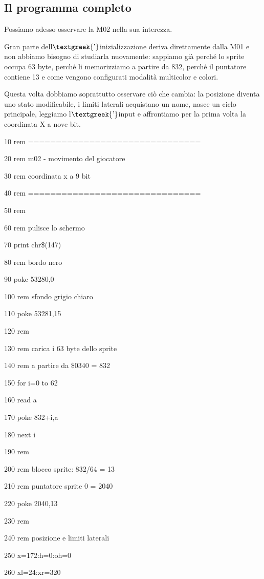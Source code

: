 \documentclass{article}
\begin{document}
\subsection{Il programma completo}
Possiamo adesso osservare la M02 nella sua interezza.

Gran parte dell$\text{\textgreek{’}}$inizializzazione deriva direttamente dalla M01 e non abbiamo bisogno di studiarla
nuovamente: sappiamo già perché lo sprite occupa 63 byte, perché li memorizziamo a partire da 832, perché il puntatore
contiene 13 e come vengono configurati modalità multicolor e colori.

Questa volta dobbiamo soprattutto osservare ciò che cambia: la posizione diventa uno stato modificabile, i limiti
laterali acquistano un nome, nasce un ciclo principale, leggiamo l$\text{\textgreek{’}}$input e affrontiamo per la
prima volta la coordinata X a nove bit.

10 rem ===============================

20 rem m02 - movimento del giocatore

30 rem coordinata x a 9 bit

40 rem ===============================

50 rem

60 rem pulisce lo schermo

70 print chr\$(147)

80 rem bordo nero

90 poke 53280,0

100 rem sfondo grigio chiaro

110 poke 53281,15

120 rem

130 rem carica i 63 byte dello sprite

140 rem a partire da \$0340 = 832

150 for i=0 to 62

160 read a

170 poke 832+i,a

180 next i

190 rem

200 rem blocco sprite: 832/64 = 13

210 rem puntatore sprite 0 = 2040

220 poke 2040,13

230 rem

240 rem posizione e limiti laterali

250 x=172:h=0:oh=0

260 xl=24:xr=320
\end{document}
